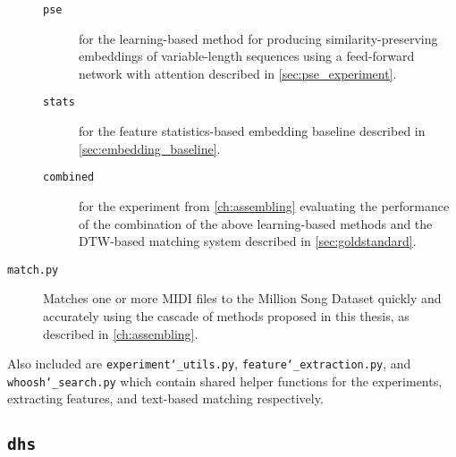 \begin{description}
\begin{description}
\item[\texttt{pse}] for the learning-based method for producing similarity-preserving embeddings of variable-length sequences using a feed-forward network with attention described in \cref{sec:pse_experiment}.
\item[\texttt{stats}] for the feature statistics-based embedding baseline described in \cref{sec:embedding_baseline}.
\item[\texttt{combined}] for the experiment from \cref{ch:assembling} evaluating the performance of the combination of the above learning-based methods and the DTW-based matching system described in \cref{sec:goldstandard}.
\end{description}
\item[\texttt{match.py}] Matches one or more MIDI files to the Million Song Dataset quickly and accurately using the cascade of methods proposed in this thesis, as described in \cref{ch:assembling}.
\end{description}

Also included are \texttt{experiment\char`_utils.py}, \texttt{feature\char`_extraction.py}, and \texttt{whoosh\char`_search.py} which contain shared helper functions for the experiments, extracting features, and text-based matching respectively.

\subsection{\texttt{dhs}}

